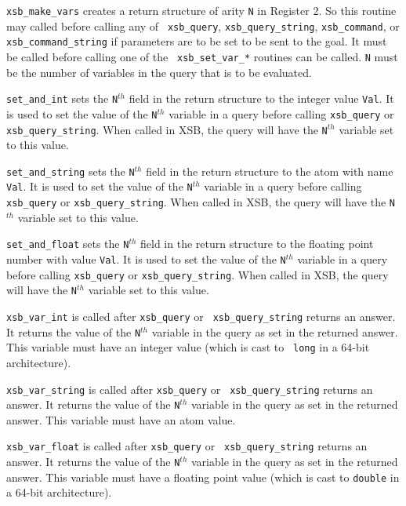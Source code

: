 \begin{description}
    {\tt xsb\_make\_vars} creates a return structure of arity {\tt N}
in Register 2.  So this routine may called before calling any of {\tt
xsb\_query}, {\tt xsb\_query\_string}, {\tt xsb\_command}, or {\tt
xsb\_command\_string} if parameters are to be set to be sent to the
goal.  It must be called before calling one of the {\tt
xsb\_set\_var\_*} routines can be called. {\tt N} must be the number
of variables in the query that is to be evaluated.

    {\tt set\_and\_int} sets the {\tt N}$^{th}$ field in the return
structure to the integer value {\tt Val}.  It is used to set the value of
the {\tt N}$^{th}$ variable in a query before calling {\tt xsb\_query} or
{\tt xsb\_query\_string}.  When called in XSB, the query will
have the {\tt N}$^{th}$ variable set to this value.

    {\tt set\_and\_string} sets the {\tt N}$^{th}$ field in the return
structure to the atom with name {\tt Val}.  It is used to set the
value of the {\tt N}$^{th}$ variable in a query before calling {\tt
xsb\_query} or {\tt xsb\_query\_string}.  When called in XSB,
the query will have the {\tt N}$^{th}$ variable set to this value.

    {\tt set\_and\_float} sets the {\tt N}$^{th}$ field in the return
structure to the floating point number with value {\tt Val}.  It is
used to set the value of the {\tt N}$^{th}$ variable in a query before
calling {\tt xsb\_query} or {\tt xsb\_query\_string}.  When called in
XSB, the query will have the {\tt N}$^{th}$ variable set to this
value.

{\tt xsb\_var\_int} is called after {\tt xsb\_query} or {\tt
xsb\_query\_string} returns an answer.  It returns the value of the
{\tt N}$^{th}$ variable in the query as set in the returned answer.
This variable must have an integer value (which is cast to {\tt
long} in a 64-bit architecture).

    {\tt xsb\_var\_string} is called after {\tt xsb\_query} or {\tt
xsb\_query\_string} returns an answer.  It returns the value of the
{\tt N}$^{th}$ variable in the query as set in the returned answer.
This variable must have an atom value.

    {\tt xsb\_var\_float} is called after {\tt xsb\_query} or {\tt
    xsb\_query\_string} returns an answer.  It returns the value of
    the {\tt N}$^{th}$ variable in the query as set in the returned
    answer.  This variable must have a floating point value (which is
    cast to {\tt double} in a 64-bit architecture).


\end{description}


